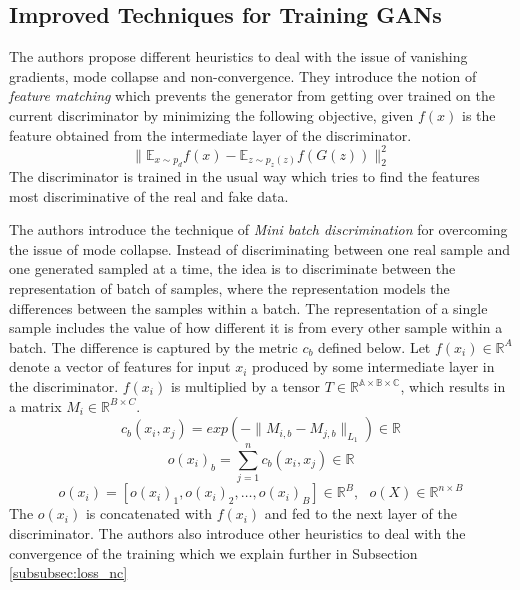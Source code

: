\subsection*{Improved Techniques for Training GANs \citep{goodfellow16}}

The authors propose different heuristics to deal with the issue of vanishing gradients, mode collapse and non-convergence. They introduce the notion of \emph{feature matching} which prevents the generator from getting over trained on the current discriminator by minimizing the following objective, given $f(x)$ is the feature obtained from the intermediate layer of the discriminator.
$$\parallel\mathbb{E}_{x \sim p_{d}}f(x) - \mathbb{E}_{z \sim p_{z}(z)} f(G(z)) \parallel _{2}^2$$
The discriminator is trained in the usual way which tries to find the features most discriminative of the real and fake data.

The authors introduce the technique of \textit{ Mini batch discrimination} for overcoming the issue of mode collapse. Instead of discriminating between one real sample and one generated sampled at a time, the idea is to discriminate between the representation of batch of samples, where the representation models the differences between the samples within a batch. The representation of a single sample includes the value of how different it is from every other sample within a batch. The difference is captured by the metric $c_b$ defined below. Let $f(x_{i}) \in \mathbb{R}^A$ denote a vector of features for input $x_{i}$ produced by some intermediate layer in the discriminator. $f(x_{i})$ is multiplied by a tensor $T \in \mathbb{R^{A \times B \times C}}$, which results in a matrix $M_{i} \in \mathbb{R}^{B \times C}.$ $$c_{b}(x_{i}, x_{j}) = exp(- \parallel M_{i, b} - M_{j, b} \parallel_{L_{1}} ) \in \mathbb{R} $$ $$o(x_{i})_{b} = \sum_{j=1}^n c_{b}(x_{i},x_{j}) \in \mathbb{R}$$ $$o(x_{i}) = [o(x_{i})_{1}, o(x_{i})_{2}, \ldots ,o(x_{i})_{B}] \in \mathbb{R}^B, \mbox{  } o(X) \in \mathbb{R}^{n \times B} $$ The $o(x_{i})$ is concatenated with $f(x_{i})$ and fed to the next layer of the discriminator.
The authors also introduce other heuristics to deal with the convergence of the training which we explain further in Subsection \ref{subsubsec:loss_nc}





